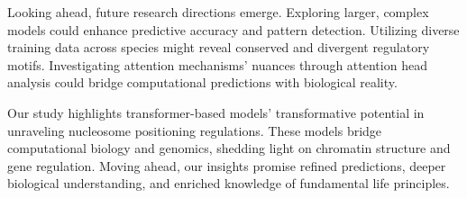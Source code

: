 \documentclass[a4paper,fleqn]{cas-dc}
\begin{document}
Looking ahead, future research directions emerge. Exploring larger, complex models could enhance predictive accuracy and pattern detection. Utilizing diverse training data across species might reveal conserved and divergent regulatory motifs. Investigating attention mechanisms' nuances through attention head analysis could bridge computational predictions with biological reality.

Our study highlights transformer-based models' transformative potential in unraveling nucleosome positioning regulations. These models bridge computational biology and genomics, shedding light on chromatin structure and gene regulation. Moving ahead, our insights promise refined predictions, deeper biological understanding, and enriched knowledge of fundamental life principles.




%


\end{document}

